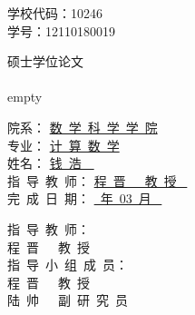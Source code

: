 \documentclass[a4paper,12pt,oneside,CJK]{cctbook}
\theoremstyle{definition}
\numberwithin{equation}{section}
\begin{document}
\pagestyle{empty}

\begin{flushright}
{
学校代码：10246{\ \ \ \ \ \ \ \ \ \ \ }\\
学{\hspace{18pt}}号：12110180019
}
\end{flushright}
\vspace{4mm}

\begin{center}
\end{center}
\vspace{4mm}

\begin{center}
{
硕\quad 士\quad 学\quad 位\quad 论\quad 文
}\\
\vspace{2.5cm}
{
{}
}\\
\vspace{1cm}
{\Large
empty
}
\end{center}
\vspace{2cm}

\begin{center}
{
院{\hspace{39pt}}系： \underline{\qquad 数\ 学\ 科\ 学\ 学\ 院 \qquad }\\
\vspace{4mm}
专{\hspace{39pt}}业： \underline{\qquad\quad 计\ 算\ 数\ 学 \qquad\qquad }\\
\vspace{4mm}
姓{\hspace{39pt}}名： \underline{\qquad\qquad 钱\ 浩\qquad\qquad\ \ }\\
\vspace{4mm}
指\ 导\ 教\ 师： \underline{\qquad\quad 程\ 晋\ \ \ 教\ 授 \quad\qquad\ }\\
\vspace{4mm}
完\ 成\ 日\ 期： \underline{\qquad{}\ 年\ 03\ 月 \quad\qquad\ }
}
\end{center}


\newpage
\thispagestyle{empty}

\begin{center}
{
{\heiti 指\ 导\ 教\ 师：}\\
\vspace{1cm}
{程\ 晋\ \ \ 教\ 授}\\
\vspace{2cm}
{\heiti  指\ 导\ 小\ 组\ 成\ 员：}\\
\vspace{1cm}
{程\ 晋\ \ \ 教\ 授}\\
\vspace{4mm}
{陆\ 帅\ \ \ 副\ 研\ 究\ 员}
}
\end{center}
\end{document}
